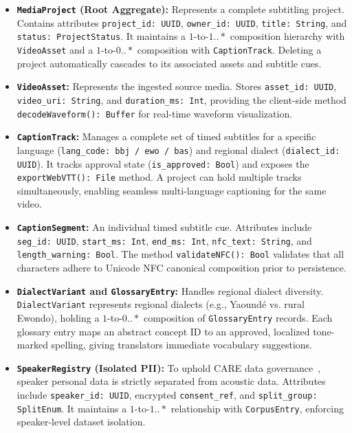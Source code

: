 \documentclass[conference]{IEEEtran}
\begin{document}
\begin{itemize}
    \item \textbf{\texttt{MediaProject} (Root Aggregate):} Represents a complete subtitling project. Contains attributes \texttt{project\_id: UUID}, \texttt{owner\_id: UUID}, \texttt{title: String}, and \texttt{status: ProjectStatus}. It maintains a $1$-to-$1..*$ composition hierarchy with \texttt{VideoAsset} and a $1$-to-$0..*$ composition with \texttt{CaptionTrack}. Deleting a project automatically cascades to its associated assets and subtitle cues.
    \item \textbf{\texttt{VideoAsset}:} Represents the ingested source media. Stores \texttt{asset\_id: UUID}, \texttt{video\_uri: String}, and \texttt{duration\_ms: Int}, providing the client-side method \texttt{decodeWaveform(): Buffer} for real-time waveform visualization.
    \item \textbf{\texttt{CaptionTrack}:} Manages a complete set of timed subtitles for a specific language (\texttt{lang\_code: bbj / ewo / bas}) and regional dialect (\texttt{dialect\_id: UUID}). It tracks approval state (\texttt{is\_approved: Bool}) and exposes the \texttt{exportWebVTT(): File} method. A project can hold multiple tracks simultaneously, enabling seamless multi-language captioning for the same video.
    \item \textbf{\texttt{CaptionSegment}:} An individual timed subtitle cue. Attributes include \texttt{seg\_id: UUID}, \texttt{start\_ms: Int}, \texttt{end\_ms: Int}, \texttt{nfc\_text: String}, and \texttt{length\_warning: Bool}. The method \texttt{validateNFC(): Bool} validates that all characters adhere to Unicode NFC canonical composition prior to persistence.
    \item \textbf{\texttt{DialectVariant} and \texttt{GlossaryEntry}:} Handles regional dialect diversity. \texttt{DialectVariant} represents regional dialects (e.g., Yaound\'e vs. rural Ewondo), holding a $1$-to-$0..*$ composition of \texttt{GlossaryEntry} records. Each glossary entry maps an abstract concept ID to an approved, localized tone-marked spelling, giving translators immediate vocabulary suggestions.
    \item \textbf{\texttt{SpeakerRegistry} (Isolated PII):} To uphold CARE data governance~\cite{carroll2020care}, speaker personal data is strictly separated from acoustic data. Attributes include \texttt{speaker\_id: UUID}, encrypted \texttt{consent\_ref}, and \texttt{split\_group: SplitEnum}. It maintains a $1$-to-$1..*$ relationship with \texttt{CorpusEntry}, enforcing speaker-level dataset isolation.

\end{itemize}
\end{document}

